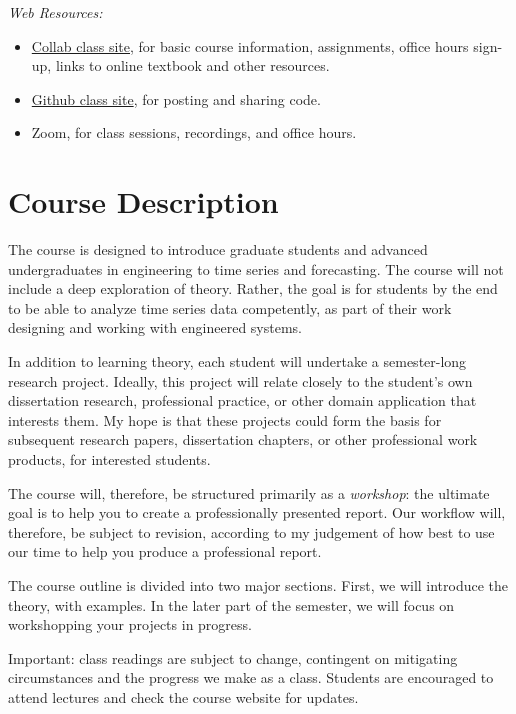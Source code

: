 \documentclass[
]{book}
\providecommand{\tightlist}{%
  \setlength{\itemsep}{0pt}\setlength{\parskip}{0pt}}
\begin{document}
\emph{Web Resources:}

\begin{itemize}
\tightlist
\item
  \href{https://collab.its.virginia.edu}{Collab class site}, for basic course information, assignments, office hours sign-up, links to online textbook and other resources.
\item
  \href{https://github.com/uva-eng-time-series-sp21}{Github class site}, for posting and sharing code.
\item
  Zoom, for class sessions, recordings, and office hours.
\end{itemize}

\hypertarget{course-description}{%
\section*{Course Description}\label{course-description}}

The course is designed to introduce graduate students and advanced undergraduates in engineering to time series and forecasting. The course will not include a deep exploration of theory. Rather, the goal is for students by the end to be able to analyze time series data competently, as part of their work designing and working with engineered systems.

In addition to learning theory, each student will undertake a semester-long research project. Ideally, this project will relate closely to the student's own dissertation research, professional practice, or other domain application that interests them. My hope is that these projects could form the basis for subsequent research papers, dissertation chapters, or other professional work products, for interested students.

The course will, therefore, be structured primarily as a \emph{workshop}: the ultimate goal is to help you to create a professionally presented report. Our workflow will, therefore, be subject to revision, according to my judgement of how best to use our time to help you produce a professional report.

The course outline is divided into two major sections. First, we will introduce the theory, with examples. In the later part of the semester, we will focus on workshopping your projects in progress.

Important: class readings are subject to change, contingent on mitigating circumstances and the progress we make as a class. Students are encouraged to attend lectures and check the course website for updates.
\end{document}
